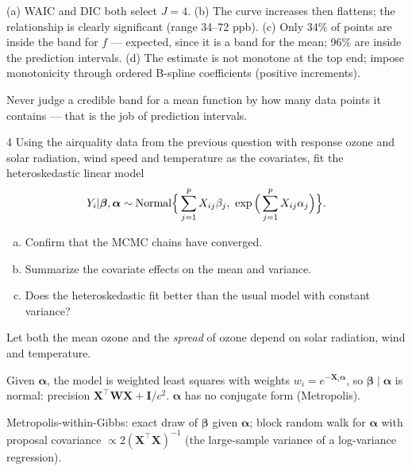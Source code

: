 \documentclass[11pt]{article}
\begin{document}
\begin{answer}
(a) WAIC and DIC both select $J=4$. (b) The curve increases then flattens; the relationship is clearly significant (range 34--72 ppb). (c) Only 34\% of points are inside the band for $f$ --- expected, since it is a band for the mean; 96\% are inside the prediction intervals. (d) The estimate is not monotone at the top end; impose monotonicity through ordered B-spline coefficients (positive increments).
\end{answer}

\begin{takeaway}
Never judge a credible band for a mean function by how many data points it contains --- that is the job of prediction intervals.
\end{takeaway}


\begin{problem}{4}
Using the airquality data from the previous question with response ozone and solar radiation, wind speed and temperature as the covariates, fit the heteroskedastic linear model
\[
Y_i|\bm\beta,\bm\alpha\sim\dist{Normal}\Big\{\sum_{j=1}^pX_{ij}\beta_j,\ \exp\Big(\sum_{j=1}^pX_{ij}\alpha_j\Big)\Big\}.
\]
\begin{enumerate}[(a)]
\item Confirm that the MCMC chains have converged.
\item Summarize the covariate effects on the mean and variance.
\item Does the heteroskedastic fit better than the usual model with constant variance?
\end{enumerate}
\end{problem}

\begin{restate}
Let both the mean ozone and the \emph{spread} of ozone depend on solar radiation, wind and temperature.
\end{restate}

\begin{recall}
Given $\bm\alpha$, the model is weighted least squares with weights $w_i=e^{-\mathbf X_i\bm\alpha}$, so $\bm\beta\mid\bm\alpha$ is normal: precision $\mathbf X^\top\mathbf W\mathbf X+\mathbf I/c^2$. $\bm\alpha$ has no conjugate form (Metropolis).
\end{recall}

\begin{keyidea}
Metropolis-within-Gibbs: exact draw of $\bm\beta$ given $\bm\alpha$; block random walk for $\bm\alpha$ with proposal covariance $\propto2(\mathbf X^\top\mathbf X)^{-1}$ (the large-sample variance of a log-variance regression).
\end{keyidea}
\end{document}
